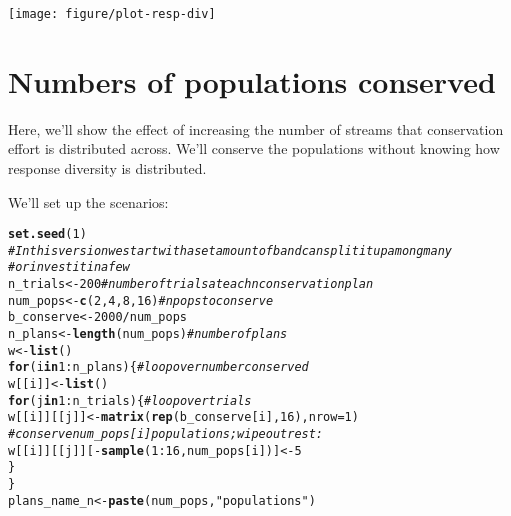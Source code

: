 \documentclass[10pt]{article}\usepackage[]{graphicx}\usepackage[]{color}
\makeatletter
\def\maxwidth{ %
  \ifdim\Gin@nat@width>\linewidth
    \linewidth
  \else
    \Gin@nat@width
  \fi
}
\newcommand{\hlnum}[1]{\textcolor[rgb]{0.686,0.059,0.569}{#1}}%
\newcommand{\hlstr}[1]{\textcolor[rgb]{0.192,0.494,0.8}{#1}}%
\newcommand{\hlcom}[1]{\textcolor[rgb]{0.678,0.584,0.686}{\textit{#1}}}%
\newcommand{\hlopt}[1]{\textcolor[rgb]{0,0,0}{#1}}%
\newcommand{\hlstd}[1]{\textcolor[rgb]{0.345,0.345,0.345}{#1}}%
\newcommand{\hlkwa}[1]{\textcolor[rgb]{0.161,0.373,0.58}{\textbf{#1}}}%
\newcommand{\hlkwb}[1]{\textcolor[rgb]{0.69,0.353,0.396}{#1}}%
\newcommand{\hlkwc}[1]{\textcolor[rgb]{0.333,0.667,0.333}{#1}}%
\newcommand{\hlkwd}[1]{\textcolor[rgb]{0.737,0.353,0.396}{\textbf{#1}}}%
\newenvironment{kframe}{%
 \def\at@end@of@kframe{}%
 \ifinner\ifhmode%
  \def\at@end@of@kframe{\end{minipage}}%
  \begin{minipage}{\columnwidth}%
 \fi\fi%
 \def\FrameCommand##1{\hskip\@totalleftmargin \hskip-\fboxsep
 \colorbox{shadecolor}{##1}\hskip-\fboxsep
     \hskip-\linewidth \hskip-\@totalleftmargin \hskip\columnwidth}%
 \MakeFramed {\advance\hsize-\width
   \@totalleftmargin\z@ \linewidth\hsize
   \@setminipage}}%
 {\par\unskip\endMakeFramed%
 \at@end@of@kframe}
\newenvironment{knitrout}{}{} %
\makeatother
\begin{document}
\begin{knitrout}
{\centering \texttt{[image: figure/plot-resp-div]} 

}



\end{knitrout}


\section{Numbers of populations conserved}

Here, we'll show the effect of increasing the number of streams that conservation effort is distributed across. We'll conserve the populations without knowing how response diversity is distributed.

We'll set up the scenarios:

\begin{knitrout}
\color{fgcolor}\begin{kframe}
\begin{alltt}
\hlkwd{set.seed}\hlstd{(}\hlnum{1}\hlstd{)}
\hlcom{# In this version we start with a set amount of b and can split it up among many}
\hlcom{# or invest it in a few}
\hlstd{n_trials} \hlkwb{<-} \hlnum{200} \hlcom{# number of trials at each n conservation plan}
\hlstd{num_pops} \hlkwb{<-} \hlkwd{c}\hlstd{(}\hlnum{2}\hlstd{,} \hlnum{4}\hlstd{,} \hlnum{8}\hlstd{,} \hlnum{16}\hlstd{)} \hlcom{# n pops to conserve}
\hlstd{b_conserve} \hlkwb{<-} \hlnum{2000} \hlopt{/} \hlstd{num_pops}
\hlstd{n_plans} \hlkwb{<-} \hlkwd{length}\hlstd{(num_pops)} \hlcom{# number of plans}
\hlstd{w} \hlkwb{<-} \hlkwd{list}\hlstd{()}
\hlkwa{for}\hlstd{(i} \hlkwa{in} \hlnum{1}\hlopt{:}\hlstd{n_plans) \{} \hlcom{# loop over number conserved}
 \hlstd{w[[i]]} \hlkwb{<-} \hlkwd{list}\hlstd{()}
 \hlkwa{for}\hlstd{(j} \hlkwa{in} \hlnum{1}\hlopt{:}\hlstd{n_trials) \{} \hlcom{# loop over trials}
   \hlstd{w[[i]][[j]]} \hlkwb{<-} \hlkwd{matrix}\hlstd{(}\hlkwd{rep}\hlstd{(b_conserve[i],} \hlnum{16}\hlstd{),} \hlkwc{nrow} \hlstd{=} \hlnum{1}\hlstd{)}
   \hlcom{# conserve num_pops[i] populations; wipe out rest:}
   \hlstd{w[[i]][[j]][}\hlopt{-}\hlkwd{sample}\hlstd{(}\hlnum{1}\hlopt{:}\hlnum{16}\hlstd{, num_pops[i])]} \hlkwb{<-} \hlnum{5}
 \hlstd{\}}
\hlstd{\}}
\hlstd{plans_name_n} \hlkwb{<-} \hlkwd{paste}\hlstd{(num_pops,} \hlstr{"populations"}\hlstd{)}
\end{alltt}
\end{kframe}
\end{knitrout}
\end{document}
